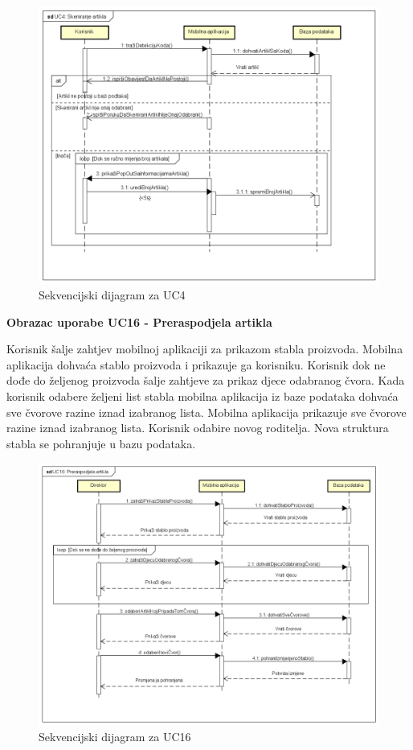 			\begin{figure}[H]
				\includegraphics[scale=0.5]{slike/sekUC4.png}
				\caption{Sekvencijski dijagram za UC4}
			\end{figure}
				
			\textbf{Obrazac uporabe UC16 - Preraspodjela artikla}
			
			Korisnik šalje zahtjev mobilnoj aplikaciji za prikazom stabla proizvoda. Mobilna aplikacija dohvaća stablo proizvoda i prikazuje ga korisniku. Korisnik dok ne dođe do željenog proizvoda šalje zahtjeve za prikaz djece odabranog čvora. Kada korisnik odabere željeni list stabla mobilna aplikacija iz baze podataka dohvaća sve čvorove razine iznad izabranog lista. Mobilna aplikacija prikazuje sve čvorove razine iznad izabranog lista. Korisnik odabire novog roditelja. Nova struktura stabla se pohranjuje u bazu podataka.
			
			\begin{figure}[H]
				\includegraphics[scale=0.5]{slike/sekUC16.png}
				\caption{Sekvencijski dijagram za UC16}
			\end{figure}
		
